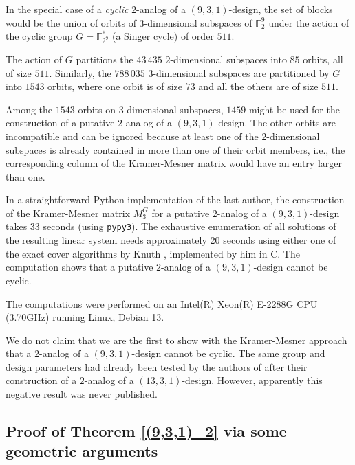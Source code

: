 \documentclass[a4paper, 11pt]{article}
\theoremstyle{definition}
\theoremstyle{definition}
\theoremstyle{definition}
\newcommand{\F}{\mathbb{F}}
\numberwithin{equation}{section}
\begin{document}
In the special case of a \emph{cyclic} $2$-analog of a $(9,3,1)$-design, the set of blocks 
would be the union of orbits of $3$-dimensional subspaces of $\F_2^9$
under the action of the cyclic group $G = \F_{2^9}^*$ (a Singer cycle) of order $511$.

The action of $G$ partitions the $43\,435$ $2$-dimensional subspaces into $85$ orbits, all of size $511$.
Similarly, the $788\,035$ $3$-dimensional subspaces are partitioned by $G$ into $1543$ orbits,
where one orbit is of size $73$ and all the others are of size $511$.

Among the $1543$ orbits on $3$-dimensional subspaces, $1459$ might be used for the construction of a putative 
$2$-analog of a $(9,3,1)$ design. The other orbits are incompatible and can be ignored
because at least one of the $2$-dimensional subspaces is already contained in more than one of their orbit members, 
i.e., the corresponding column of the Kramer-Mesner matrix would have an entry larger than one.

In a straightforward Python implementation of the last author, 
the construction of the Kramer-Mesner matrix $M_{3}^G$ for a putative $2$-analog of a $(9,3,1)$-design 
takes 33 seconds (using \texttt{pypy3}).
The exhaustive enumeration of all solutions of the resulting linear system needs approximately
20 seconds using either one of the
exact cover algorithms by Knuth \cite{knuth:fasc5,knuth:fasc7}, implemented by him in C. 
The computation shows that a putative $2$-analog of a $(9,3,1)$-design cannot be cyclic.

The computations were performed on an Intel(R) Xeon(R) E-2288G CPU (3.70GHz) running Linux, Debian 13.

We do not claim that we are the first to show with the Kramer-Mesner approach that a 
$2$-analog of a $(9,3,1)$-design cannot be cyclic. The same group and design parameters 
had already been tested by the authors of \cite{BEOVW} after their construction of a 
$2$-analog of a $(13,3,1)$-design.
However, apparently this negative result was never published.




\subsection{Proof of Theorem \ref{(9,3,1)_2}  via some geometric arguments}\label{AM}
\end{document}
